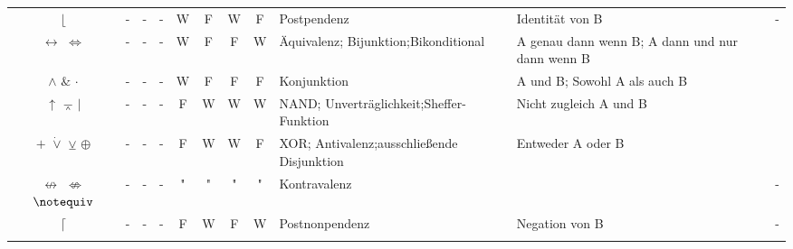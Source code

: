 \documentclass[english,ngerman,parskip=half,headsepline,footsepline,
	fleqn,notitlepage]{scrreprt}
\newcommand*{\ladd}{+}
\newcommand*{\lmult}{\cdot}
\newcommand*{\texttrue}{W}%
\newcommand*{\textfalse}{F}%
\newcommand*{\lright}{\operatorname{\lfloor}}%
\newcommand*{\lequiv}{\leftrightarrow}%
\newcommand*{\lequivA}{\Leftrightarrow}%
\newcommand*{\landA}{\&}
\newcommand*{\landB}{\lmult}
\newcommand*{\lnand}{\uparrow}%
\newcommand*{\lnandA}{\barwedge}%
\newcommand*{\lnandB}{\mid}%
\newcommand*{\lxor}{\ladd}%
\newcommand*{\lxorA}{\operatorname{\dot\lor}}%
\newcommand*{\lxorB}{\veebar}%
\newcommand*{\lxorC}{\oplus}%
\newcommand*{\lnequiv}{\nleftrightarrow}%
\newcommand*{\lnequivA}{\nLeftrightarrow}%
\newcommand*{\lnequivB}{\notequiv}%
\newcommand*{\lnright}{\lceil}%
\begin{document}
\begin{table}
\begin{threeparttable}
\begin{tabularx}{\linewidth-10.95pt}{c||c:cc:cccc|X:X|c|}
				$\lright$
				& - & - & - &\texttrue&\textfalse&\texttrue&\textfalse
				& Postpendenz
				& Identität von B
				& - \\

				\tableline%

				$\lequiv$ $\lequivA$
				& - & - & - &\texttrue&\textfalse&\textfalse&\texttrue
				& Äquivalenz; Bijunktion;\newline Bikonditional
				& A genau dann wenn B; A dann und nur dann wenn B
				& \thepequiv \\

				\tableline%

				$\land$ $\landA$ $\landB$
				& - & - & - &\texttrue&\textfalse&\textfalse&\textfalse
				& Konjunktion
				& {\small A und B; Sowohl A als auch B}
				& \thepand \\

				\tablegroup%

				$\lnand$ $\lnandA$ $\lnandB$
				& - & - & - &\textfalse&\texttrue&\texttrue&\texttrue
				& NAND; Unverträglichkeit;\newline Sheffer-Funktion
				& Nicht zugleich A und B
				& \thepnand \\

				\tableline%

				$\lxor$ $\lxorA$ $\lxorB$ $\lxorC$
				& - & - & - &\textfalse&\texttrue&\texttrue&\textfalse
				& XOR; Antivalenz;\newline ausschließende Disjunktion
				& Entweder A oder B
				& \thepxor \\

				\gapline%

				$\lnequiv$ $\lnequivA$ $\lnequivB$
				& - & - & - &"&"&"&"
				& Kontravalenz
				&
				& - \\

				\tableline%

				$\lnright$
				& - & - & - &\textfalse&\texttrue&\textfalse&\texttrue
				& Postnonpendenz
				& Negation von B
				& - \\

				\tableline%


\end{tabularx}
\end{threeparttable}
\end{table}
\end{document}
